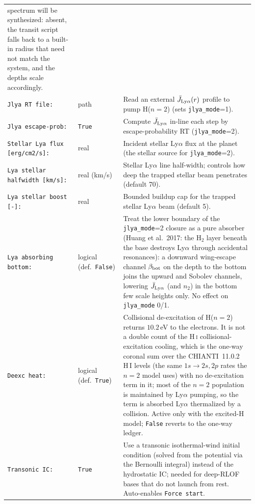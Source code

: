 \documentclass[english,a4paper]{my_memo}
\begin{document}
\begin{longtable}{@{}p{}p{}p{}@{}}
  spectrum will be synthesized: absent, the transit script falls back to a
  built-in radius that need not match the system, and the depths scale
  accordingly. \\
\texttt{Jlya RT file:} & path & Read an external $\bar J_{\rm Ly\alpha}(r)$ profile
  to pump H($n{=}2$) (sets \texttt{jlya\_mode}=1). \\
\texttt{Jlya escape-prob:} & \texttt{True} & Compute $\bar J_{\rm Ly\alpha}$
  in-line each step by escape-probability RT (\texttt{jlya\_mode}=2). \\
\texttt{Stellar Lya flux [erg/cm2/s]:} & real & Incident stellar Ly$\alpha$ flux
  at the planet (the stellar source for \texttt{jlya\_mode}=2). \\
\texttt{Lya stellar halfwidth [km/s]:} & real (km/s) & Stellar Ly$\alpha$ line
  half-width; controls how deep the trapped stellar beam penetrates (default 70). \\
\texttt{Lya stellar boost [-]:} & real & Bounded buildup cap for the trapped
  stellar Ly$\alpha$ beam (default 5). \\
\texttt{Lya absorbing bottom:} & logical (def.\ \texttt{False}) & Treat the
  lower boundary of the \texttt{jlya\_mode}=2 closure as a pure absorber
  (Huang et al.\ 2017: the H$_2$ layer beneath the base destroys Ly$\alpha$
  through accidental resonances): a downward wing-escape channel
  $\beta_{\rm bot}$ on the depth to the bottom joins the upward and Sobolev
  channels, lowering $\bar J_{\rm Ly\alpha}$ (and $n_2$) in the bottom few
  scale heights only. No effect on \texttt{jlya\_mode} 0/1. \\
\texttt{Deexc heat:} & logical (def.\ \texttt{True}) & Collisional de-excitation
  of H($n{=}2$) returns $10.2\,$eV to the electrons. It is not a double count of
  the H\,\textsc{i} collisional-excitation cooling, which is the one-way coronal
  sum over the CHIANTI~11.0.2 H\,I levels (the same $1s\to2s,2p$ rates the
  $n{=}2$ model uses) with no de-excitation term in it; most of the $n{=}2$
  population is maintained by Ly$\alpha$ pumping, so the term is absorbed
  Ly$\alpha$ thermalized by a collision. Active only with the excited-H model;
  \texttt{False} reverts to the one-way ledger. \\
\texttt{Transonic IC:} & \texttt{True} & Use a transonic isothermal-wind initial
  condition (solved from the potential via the Bernoulli integral) instead of the
  hydrostatic IC; needed for deep-RLOF bases that do not launch from rest.
  Auto-enables \texttt{Force start}. \\

\end{longtable}
\end{document}
